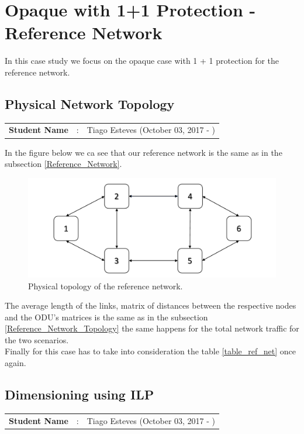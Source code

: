\clearpage

\section{Opaque with 1+1 Protection - Reference Network}
In this case study we focus on the opaque case with 1 + 1 protection for the reference network.

\subsection{Physical Network Topology}
\begin{tcolorbox}	
\begin{tabular}{p{2.75cm} p{0.2cm} p{10.5cm}} 	
\textbf{Student Name}  &:& Tiago Esteves    (October 03, 2017 - )\\
\end{tabular}
\end{tcolorbox}

In the figure below we ca see that our reference network is the same as in the subsection \ref{Reference_Network}.

\begin{figure}[h!]
\centering
\includegraphics[width=\textwidth]{sdf/opaque/figures/RedeTeste}
\caption{Physical topology of the reference network.}
\end{figure}

The average length of the links, matrix of distances between the respective nodes and the ODU's matrices is the same as in the subsection \ref{Reference_Network_Topology} the same happens for the total network traffic for the two scenarios.\\

Finally for this case has to take into consideration the table \ref{table_ref_net} once again.


\subsection{Dimensioning using ILP}
\begin{tcolorbox}	
\begin{tabular}{p{2.75cm} p{0.2cm} p{10.5cm}} 	
\textbf{Student Name}  &:& Tiago Esteves    (October 03, 2017 - )\\
\end{tabular}
\end{tcolorbox}


